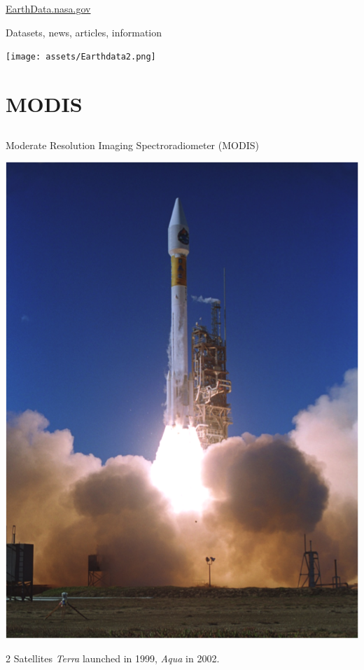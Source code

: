 \documentclass[ignorenonframetext,]{beamer}
\begin{document}
\begin{frame}{\href{https://earthdata.nasa.gov}{EarthData.nasa.gov}}

Datasets, news, articles, information

\texttt{[image: assets/Earthdata2.png]}

\end{frame}

\section{MODIS}\label{modis}

\subsection{}\label{section-2}

\begin{frame}{Moderate Resolution Imaging Spectroradiometer (MODIS)}

\includegraphics{assets/TerraLaunch.png}

2 Satellites \emph{Terra} launched in 1999, \emph{Aqua} in 2002.

\end{frame}
\end{document}
